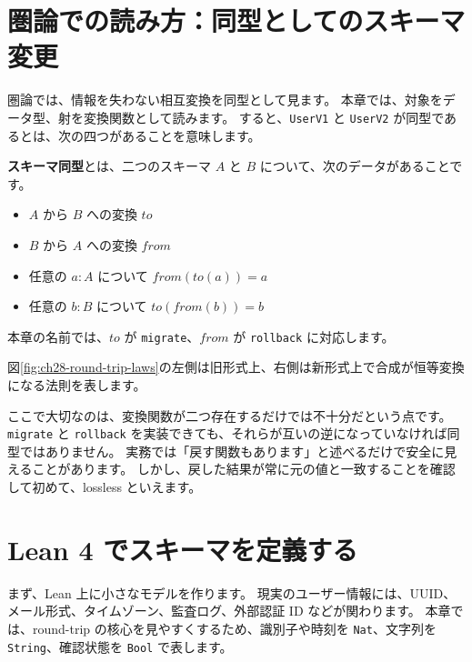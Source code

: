 \section{圏論での読み方：同型としてのスキーマ変更}

圏論では、情報を失わない相互変換を同型として見ます。
本章では、対象をデータ型、射を変換関数として読みます。
すると、\texttt{UserV1} と \texttt{UserV2} が同型であるとは、次の四つがあることを意味します。

\textbf{スキーマ同型}とは、二つのスキーマ \(A\) と \(B\) について、次のデータがあることです。
\begin{itemize}
\item \(A\) から \(B\) への変換 \(\mathit{to}\)
\item \(B\) から \(A\) への変換 \(\mathit{from}\)
\item 任意の \(a : A\) について \(\mathit{from}(\mathit{to}(a)) = a\)
\item 任意の \(b : B\) について \(\mathit{to}(\mathit{from}(b)) = b\)
\end{itemize}
本章の名前では、\(\mathit{to}\) が \texttt{migrate}、\(\mathit{from}\) が \texttt{rollback} に対応します。

図\ref{fig:ch28-round-trip-laws}の左側は旧形式上、右側は新形式上で合成が恒等変換になる法則を表します。


ここで大切なのは、変換関数が二つ存在するだけでは不十分だという点です。
\texttt{migrate} と \texttt{rollback} を実装できても、それらが互いの逆になっていなければ同型ではありません。
実務では「戻す関数もあります」と述べるだけで安全に見えることがあります。
しかし、戻した結果が常に元の値と一致することを確認して初めて、lossless といえます。

\section{Lean 4 でスキーマを定義する}

まず、Lean 上に小さなモデルを作ります。
現実のユーザー情報には、UUID、メール形式、タイムゾーン、監査ログ、外部認証 ID などが関わります。
本章では、round-trip の核心を見やすくするため、識別子や時刻を \texttt{Nat}、文字列を \texttt{String}、確認状態を \texttt{Bool} で表します。

